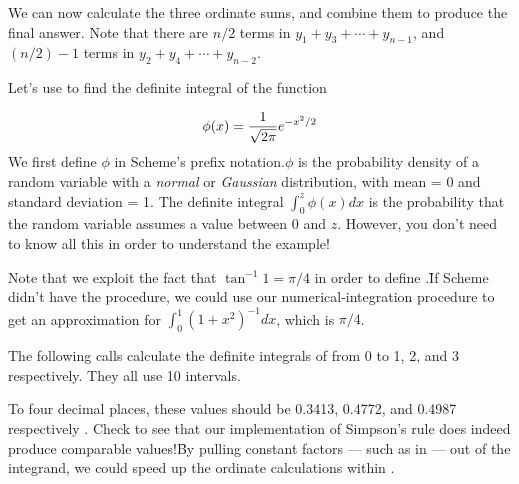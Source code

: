 
\n We can now calculate the three ordinate sums, and
combine them to produce the final answer.  Note
that there are $n/2$ terms in $y_1 + y_3 + \cdots +
y_{n-1}$, and $(n/2) - 1$ terms in $y_2 + y_4 + \cdots
+ y_{n-2}$.


\n Let’s use  to find the definite
integral of the function

$$
\phi(x) = {1\over \sqrt{2\pi}} e^{-x^2/2}
$$
%
We first define $\phi$ in Scheme’s prefix
notation.\f{$\phi$
is the probability density of a
random variable with a {\em normal} or {\em Gaussian}
distribution, with mean = 0 and standard deviation = 1.
The definite integral $\int_0^z \phi(x) dx$
is the probability that the random
variable assumes a value between 0 and $z$.
However, you don’t need to know all this in
order to understand the example!}


\n Note that we exploit the fact that $\tan^{-1} 1 =
\pi/4$ in order to define .\f{If Scheme didn’t
have the  procedure, we could use our
numerical-integration procedure to get an approximation
for $\int_0^1 (1 + x^2)^{-1} dx$, which is $\pi/4$.}

The following calls calculate the definite integrals of
 from 0 to 1, 2, and 3 respectively.  They
all use 10 intervals.


\n To four decimal places, these values should be
0.3413, 0.4772, and 0.4987 respectively \cite[Table
26.1]{hmf}.  Check to see that our implementation
of Simpson’s rule does indeed produce comparable
values!\f{By pulling constant factors — such as  in  — out of the
integrand, we could speed up the ordinate calculations
within .}

